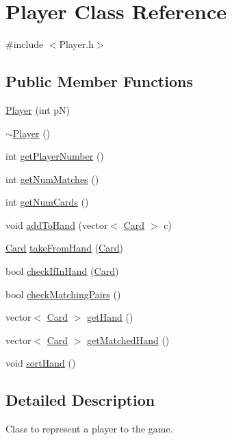 \hypertarget{class_player}{\section{Player Class Reference}
\label{class_player}
}


{\ttfamily \#include $<$Player.\-h$>$}

\subsection*{Public Member Functions}
\begin{DoxyCompactItemize}
\item 
\hyperlink{class_player_a80d1293f6f49b886db318f1dae7be23b}{Player} (int p\-N)
\item 
\hyperlink{class_player_a749d2c00e1fe0f5c2746f7505a58c062}{$\sim$\-Player} ()
\item 
int \hyperlink{class_player_ae72235dee0a2f7abbcb82002164623aa}{get\-Player\-Number} ()
\item 
int \hyperlink{class_player_abdea2b45e1a98e9942bdaca85f451734}{get\-Num\-Matches} ()
\item 
int \hyperlink{class_player_a8157f88bbd4048e52e4fca94e92b49ac}{get\-Num\-Cards} ()
\item 
void \hyperlink{class_player_ace93c12489cea500770591ccb47a2a0c}{add\-To\-Hand} (vector$<$ \hyperlink{class_card}{Card} $>$ c)
\item 
\hyperlink{class_card}{Card} \hyperlink{class_player_aa98f63d75da7cae403510b4c1e2a6ce9}{take\-From\-Hand} (\hyperlink{class_card}{Card})
\item 
bool \hyperlink{class_player_ac9576fddfaa9c54a11f50df5604ec10c}{check\-If\-In\-Hand} (\hyperlink{class_card}{Card})
\item 
bool \hyperlink{class_player_adf635ce5997b0d4647a6f7d09b526dac}{check\-Matching\-Pairs} ()
\item 
vector$<$ \hyperlink{class_card}{Card} $>$ \hyperlink{class_player_a6ca673336972f29fdc094b3f0f1f7f84}{get\-Hand} ()
\item 
vector$<$ \hyperlink{class_card}{Card} $>$ \hyperlink{class_player_a09fbf15e6a001feea60cb53d02ec3912}{get\-Matched\-Hand} ()
\item 
void \hyperlink{class_player_a2369527c90f1168eac2dc3f7bfaefc43}{sort\-Hand} ()
\end{DoxyCompactItemize}


\subsection{Detailed Description}
Class to represent a player to the game. 

